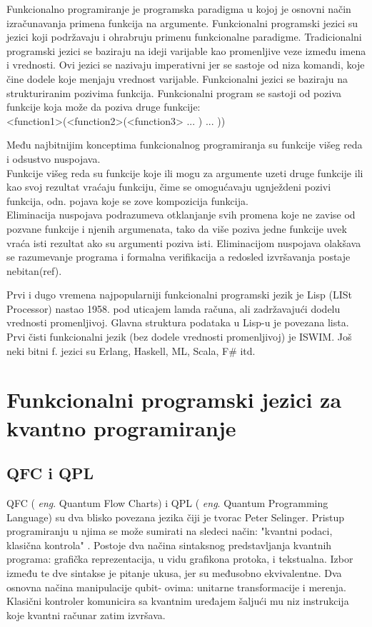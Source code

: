 \documentclass[a4paper]{article}
\begin{document}
{Funkcionalno programiranje je programska paradigma u kojoj je osnovni način izračunavanja primena funkcija na argumente.\cite[p. 3]{funcPro}
Funkcionalni programski jezici su jezici koji podržavaju i ohrabruju primenu funkcionalne paradigme.
Tradicionalni programski jezici se baziraju na ideji varijable kao promenljive veze između imena i vrednosti. Ovi jezici se nazivaju 
imperativni jer se sastoje od niza komandi, koje čine dodele koje menjaju vrednost varijable.
Funkcionalni jezici se baziraju na strukturiranim pozivima funkcija. Funkcionalni program se sastoji od poziva funkcije koja može da
poziva druge funkcije:\\
<function1>(<function2>(<function3> ... ) ... ))\cite[p. 4]{funcPro}

Među najbitnijim konceptima funkcionalnog programiranja su funkcije višeg reda i odsustvo nuspojava. \\
Funkcije višeg reda su funkcije koje ili mogu za argumente uzeti druge funkcije ili kao svoj rezultat vraćaju funkciju, čime se omogućavaju ugnježdeni pozivi funkcija, odn. pojava koje se zove kompozicija funkcija.\\
Eliminacija nuspojava podrazumeva otklanjanje svih promena koje ne zavise od pozvane funkcije i njenih argumenata, tako da više poziva jedne funkcije uvek vraća isti rezultat ako su argumenti poziva isti. Eliminacijom nuspojava olakšava se razumevanje programa i formalna 
verifikacija a redosled izvršavanja postaje nebitan(ref).\par
Prvi i dugo vremena najpopularniji funkcionalni programski jezik je Lisp (LISt Processor) nastao 1958. pod uticajem lamda računa, ali 
zadržavajući dodelu vrednosti promenljivoj. Glavna struktura podataka u Lisp-u je povezana lista. Prvi čisti funkcionalni jezik 
(bez dodele vrednosti promenljivoj) je ISWIM. Još neki bitni f. jezici su Erlang, Haskell, ML, Scala, F\# itd.

\section{Funkcionalni programski jezici za kvantno programiranje}
\label{sec:funcprl_qp}

\subsection{QFC i QPL}\cite{qfc}
\label{sec:qfc_qml}

QFC ( \emph{eng}. Quantum Flow Charts) i QPL ( \emph{eng}. Quantum Programming Language) su dva blisko povezana jezika čiji je tvorac Peter Selinger.  Pristup programiranju u njima se može sumirati na sledeci način: "kvantni podaci, klasična kontrola" \cite[p. 1]{qfc}. Postoje dva načina sintaksnog predstavljanja kvantnih programa: grafička reprezentacija, u vidu grafikona protoka, i tekstualna. Izbor između te dve sintakse je pitanje ukusa, jer su međusobno ekvivalentne. \cite[p. 2]{qfc} Dva osnovna načina manipulacije qubit- ovima: unitarne transformacije i merenja. Klasični kontroler komunicira sa kvantnim uređajem šaljući mu niz instrukcija koje kvantni računar zatim izvršava. 

}
\end{document}
